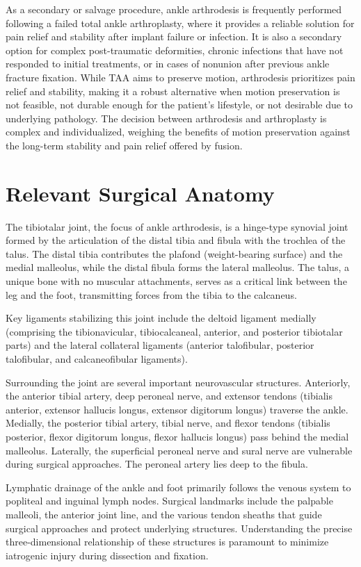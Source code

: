 As a secondary or salvage procedure, ankle arthrodesis is frequently performed following a failed total ankle arthroplasty, where it provides a reliable solution for pain relief and stability after implant failure or infection. It is also a secondary option for complex post-traumatic deformities, chronic infections that have not responded to initial treatments, or in cases of nonunion after previous ankle fracture fixation. While TAA aims to preserve motion, arthrodesis prioritizes pain relief and stability, making it a robust alternative when motion preservation is not feasible, not durable enough for the patient's lifestyle, or not desirable due to underlying pathology. The decision between arthrodesis and arthroplasty is complex and individualized, weighing the benefits of motion preservation against the long-term stability and pain relief offered by fusion.

\section*{Relevant Surgical Anatomy}
The tibiotalar joint, the focus of ankle arthrodesis, is a hinge-type synovial joint formed by the articulation of the distal tibia and fibula with the trochlea of the talus. The distal tibia contributes the plafond (weight-bearing surface) and the medial malleolus, while the distal fibula forms the lateral malleolus. The talus, a unique bone with no muscular attachments, serves as a critical link between the leg and the foot, transmitting forces from the tibia to the calcaneus. 

Key ligaments stabilizing this joint include the deltoid ligament medially (comprising the tibionavicular, tibiocalcaneal, anterior, and posterior tibiotalar parts) and the lateral collateral ligaments (anterior talofibular, posterior talofibular, and calcaneofibular ligaments). 

Surrounding the joint are several important neurovascular structures. Anteriorly, the anterior tibial artery, deep peroneal nerve, and extensor tendons (tibialis anterior, extensor hallucis longus, extensor digitorum longus) traverse the ankle. Medially, the posterior tibial artery, tibial nerve, and flexor tendons (tibialis posterior, flexor digitorum longus, flexor hallucis longus) pass behind the medial malleolus. Laterally, the superficial peroneal nerve and sural nerve are vulnerable during surgical approaches. The peroneal artery lies deep to the fibula. 

Lymphatic drainage of the ankle and foot primarily follows the venous system to popliteal and inguinal lymph nodes. Surgical landmarks include the palpable malleoli, the anterior joint line, and the various tendon sheaths that guide surgical approaches and protect underlying structures. Understanding the precise three-dimensional relationship of these structures is paramount to minimize iatrogenic injury during dissection and fixation.

